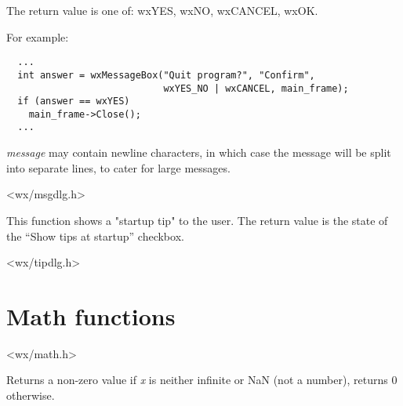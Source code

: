 The return value is one of: wxYES, wxNO, wxCANCEL, wxOK.

For example:

\begin{verbatim}
  ...
  int answer = wxMessageBox("Quit program?", "Confirm",
                            wxYES_NO | wxCANCEL, main_frame);
  if (answer == wxYES)
    main_frame->Close();
  ...
\end{verbatim}

{\it message} may contain newline characters, in which case the
message will be split into separate lines, to cater for large messages.


<wx/msgdlg.h>


\label{wxshowtip}


This function shows a "startup tip" to the user. The return value is the
state of the ``Show tips at startup'' checkbox.







<wx/tipdlg.h>




\section{Math functions}


<wx/math.h>


\label{wxfinite}


Returns a non-zero value if {\it x} is neither infinite or NaN (not a number), 
returns 0 otherwise.


